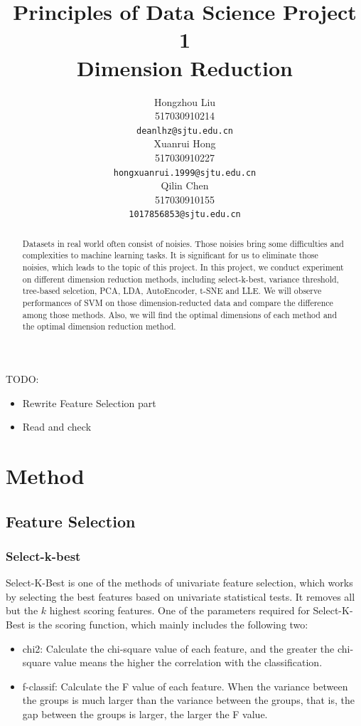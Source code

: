 \documentclass{article}
\title{Principles of Data Science Project 1\\
        Dimension Reduction}
\author{
  Hongzhou Liu \\
  517030910214 \\
  \texttt{deanlhz@sjtu.edu.cn} \\
  \And
  Xuanrui Hong \\
  517030910227 \\
  \texttt{hongxuanrui.1999@sjtu.edu.cn} \\
  \And
  Qilin Chen \\
  517030910155 \\
  \texttt{1017856853@sjtu.edu.cn} \\
}
\begin{document}


\maketitle

TODO:
\begin{itemize}
	\item Rewrite Feature Selection part
	\item Read and check
\end{itemize}

\begin{abstract}
\indent Datasets in real world often consist of noisies. Those noisies bring some difficulties and complexities to machine learning tasks. It is significant for us to eliminate those noisies, which leads to the topic of this project.
In this project, we conduct experiment on different dimension reduction methods, including select-k-best, variance threshold, tree-based selcetion, PCA, LDA, AutoEncoder, t-SNE and LLE.
We will observe performances of SVM on those dimension-reducted data and compare the difference among those methods. Also, we will find the optimal dimensions of each method and the optimal dimension reduction method.
\end{abstract}

\section{Method}
\subsection{Feature Selection}
\subsubsection{Select-k-best}
\indent Select-K-Best is one of the methods of univariate feature selection, which works by selecting the best features based on univariate statistical tests. It removes all but the $k$ highest scoring features. One of the parameters required for Select-K-Best is the scoring function, which mainly includes the following two:
\begin{itemize}
	\item chi2: Calculate the chi-square value of each feature, and the greater the chi-square value means the higher the correlation with the classification.
	
	\item f-classif: Calculate the F value of each feature. When the variance between the groups is much larger than the variance between the groups, that is, the gap between the groups is larger, the larger the F value.	
\end{itemize}
\end{document}

